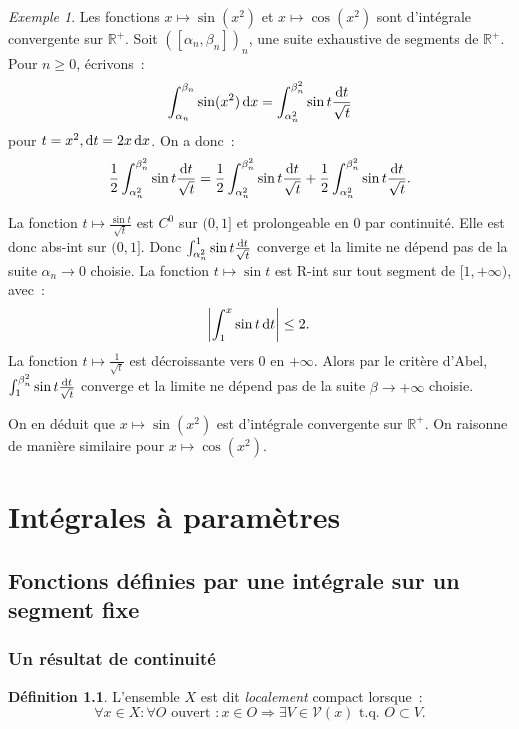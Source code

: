 \documentclass{report}
\theoremstyle{definition}
\newtheorem{déf}[thm]{Définition}
\theoremstyle{remark}
\newtheorem{ex}{Exemple}[chapter]
\numberwithin{equation}{section}
\newcommand{\R}{\mathbb R}
\newcommand{\Rp}{\R^{+}}
\newcommand{\tq}{\text{ t.q. }}
\newcommand{\pinfty}{{+\infty}}
\begin{document}
			\begin{ex}Les fonctions $x \mapsto \sin(x^2)$ et $x \mapsto \cos(x^2)$ sont d'intégrale convergente sur $\Rp$. Soit $([\alpha_n, \beta_n])_n$, une suite
			exhaustive de segments de $\Rp$. Pour $n \geq 0$, écrivons~:
			\begin{equation}
				\int_{\alpha_n}^{\beta_n}\sin(x^2)\dif x = \int_{\alpha_n^2}^{\beta_n^2}\sin t\frac {\dif t}{\sqrt t}
			\end{equation}
			pour $t = x^2, \dif t = 2x\dif x$. On a donc~:
			\begin{equation}
				\frac 12\int_{\alpha_n^2}^{\beta_n^2}\sin t\frac {\dif t}{\sqrt t}
				= \frac 12\int_{\alpha_n^2}^{\beta_n^2}\sin t \frac {\dif t}{\sqrt t} + \frac 12\int_{\alpha_n^2}^{\beta_n^2}\sin t\frac {\dif t}{\sqrt t}.
			\end{equation}

			La fonction $t \mapsto \frac {\sin t}{\sqrt t}$ est $C^0$ sur $(0, 1]$ et prolongeable en $0$ par continuité. Elle est donc abs-int sur $(0, 1]$. Donc
			$\int_{\alpha_n^2}^1\sin t \frac {\dif t}{\sqrt t}$ converge et la limite ne dépend pas de la suite $\alpha_n \to 0$ choisie.
			La fonction $t \mapsto \sin t$ est R-int sur tout segment de $[1, \pinfty)$, avec~:
			\begin{equation}
				\abs {\int_1^x\sin t\dif t} \leq 2.
			\end{equation}
			La fonction $t \mapsto \frac 1{\sqrt t}$ est décroissante vers $0$ en $\pinfty$. Alors par le critère d'Abel,
			$\int_1^{\beta_n^2}\sin t\frac {\dif t}{\sqrt t}$ converge et la limite ne dépend pas de la suite $\beta \to \pinfty$ choisie.

			On en déduit que $x \mapsto \sin(x^2)$ est d'intégrale convergente sur $\Rp$. On raisonne de manière similaire pour $x \mapsto \cos(x^2)$.
			\end{ex}

\chapter{Intégrales à paramètres}
	\section{Fonctions définies par une intégrale sur un segment fixe}
		\subsection{Un résultat de continuité}
			\begin{déf} L'ensemble $X$ est dit \textit{localement} compact lorsque~:
			\begin{equation}
				\forall x \in X : \forall O \text{ ouvert } : x \in O \Rightarrow \exists V \in \mathcal V(x) \tq O \subset V.
			\end{equation}
			\end{déf}
\end{document}
